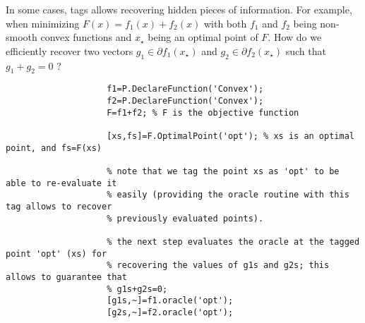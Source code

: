 \documentclass[11pt,a4paper]{article}
\begin{document}
					In some cases, tags allows recovering hidden pieces of information. For example, when minimizing $F(x)=f_1(x)+f_2(x)$ with both $f_1$ and $f_2$ being non-smooth convex functions and $x_\star$ being an optimal point of $F$.  How do we efficiently recover two vectors $g_1\in\partial f_1(x_\star)$ and $g_2\in\partial f_2(x_\star)$ such that $g_1+g_2=0$ ?\\[-1cm]
					\begin{lstlisting}
					f1=P.DeclareFunction('Convex');
					f2=P.DeclareFunction('Convex');
					F=f1+f2; % F is the objective function

					[xs,fs]=F.OptimalPoint('opt'); % xs is an optimal point, and fs=F(xs)

					% note that we tag the point xs as 'opt' to be able to re-evaluate it
					% easily (providing the oracle routine with this tag allows to recover
					% previously evaluated points).

					% the next step evaluates the oracle at the tagged point 'opt' (xs) for
					% recovering the values of g1s and g2s; this allows to guarantee that
					% g1s+g2s=0;
					[g1s,~]=f1.oracle('opt');
					[g2s,~]=f2.oracle('opt');
					\end{lstlisting}
\end{document}
